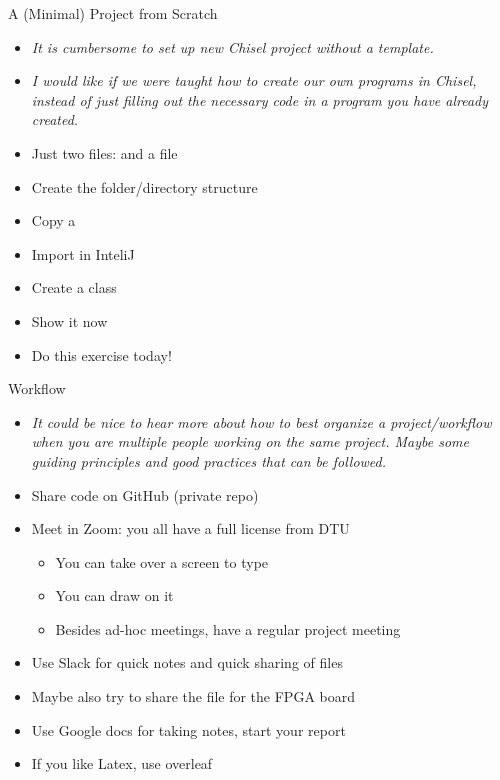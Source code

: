 \begin{frame}[fragile]{A (Minimal) Project from Scratch}
\begin{itemize}
\item \emph{It is cumbersome to set up new Chisel project without a template.}
\item \emph{I would like if we were taught how to create our own programs in Chisel, instead of just filling out the necessary code in a program you have already created.}
\item Just two files:  and a  file
\item Create the folder/directory structure
\item Copy a 
\item Import in InteliJ
\item Create a  class
\item Show it now
\item Do this exercise today!
\end{itemize}
\end{frame}

\begin{frame}[fragile]{Workflow}
\begin{itemize}
\item \emph{It could be nice to hear more about how to best organize a project/workflow when you are multiple people working on the same project. Maybe some guiding principles and good practices that can be followed.}
\item Share code on GitHub (private repo)
\item Meet in Zoom: you all have a full license from DTU
\begin{itemize}
\item You can take over a screen to type
\item You can draw on it
\item Besides ad-hoc meetings, have a regular project meeting
\end{itemize}
\item Use Slack for quick notes and quick sharing of files
\item Maybe also try to share the  file for the FPGA board
\item Use Google docs for taking notes, start your report
\item If you like Latex, use overleaf
\end{itemize}
\end{frame}


